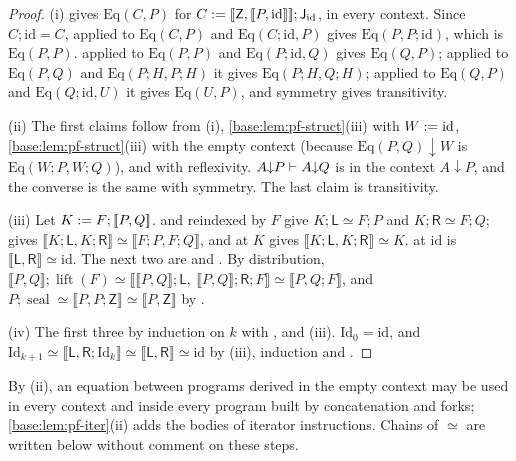 \begin{proof}
(i)  gives $\mathrm{Eq}(C,P)$ for
$C\mathrel{:=}[\![\mathsf Z,[\![ P,\mathrm{id}]\!]]\!];
\mathsf J_{\mathrm{id}}$, in every context.  Since $C;\mathrm{id}=C$,
 applied to $\mathrm{Eq}(C,P)$ and
$\mathrm{Eq}(C;\mathrm{id},P)$ gives $\mathrm{Eq}(P,P;\mathrm{id})$, which
is $\mathrm{Eq}(P,P)$.   applied to $\mathrm{Eq}(P,P)$ and
$\mathrm{Eq}(P;\mathrm{id},Q)$ gives $\mathrm{Eq}(Q,P)$; applied to
$\mathrm{Eq}(P,Q)$ and $\mathrm{Eq}(P;H,P;H)$ it gives
$\mathrm{Eq}(P;H,Q;H)$; applied to $\mathrm{Eq}(Q,P)$ and
$\mathrm{Eq}(Q;\mathrm{id},U)$ it gives $\mathrm{Eq}(U,P)$, and symmetry
gives transitivity.

(ii) The first claims follow from (i), \cref{base:lem:pf-struct}(iii) with
$W\mathrel{:=}\mathrm{id}$, \cref{base:lem:pf-struct}(iii) with the empty context
(because $\mathrm{Eq}(P,Q){\downarrow}W$ is $\mathrm{Eq}(W;P,W;Q)$), and
 with reflexivity.  $A{\downarrow}P\vdash A{\downarrow}Q$ is
 in the context $A{\downarrow}P$, and the converse is
the same with symmetry.  The last claim is transitivity.

(iii) Let $K\mathrel{:=} F;[\![ P,Q]\!]$.   and
 reindexed by $F$ give $K;\mathsf L\simeq F;P$ and
$K;\mathsf R\simeq F;Q$;  gives
$\llbracket K;\mathsf L,K;\mathsf R\rrbracket\simeq\llbracket F;P,F;Q\rrbracket$,
and  at $K$ gives
$\llbracket K;\mathsf L,K;\mathsf R\rrbracket\simeq K$.   at
$\mathrm{id}$ is $\llbracket\mathsf L,\mathsf R\rrbracket\simeq\mathrm{id}$.
The next two are  and .  By distribution,
$\llbracket P,Q\rrbracket;\operatorname{lift}(F)\simeq
\llbracket\llbracket P,Q\rrbracket;\mathsf L,\
\llbracket P,Q\rrbracket;\mathsf R;F\rrbracket\simeq\llbracket P,Q;F\rrbracket$,
and $P;\operatorname{seal}\simeq\llbracket P,P;\mathsf Z\rrbracket\simeq
\llbracket P,\mathsf Z\rrbracket$ by \rulename{C0}.

(iv) The first three by induction on $k$ with , 
and (iii).  $\mathrm{Id}_0=\mathrm{id}$, and
$\mathrm{Id}_{k+1}\simeq\llbracket\mathsf L,\mathsf R;\mathrm{Id}_k\rrbracket
\simeq\llbracket\mathsf L,\mathsf R\rrbracket\simeq\mathrm{id}$ by (iii),
induction and \rulename{CE}.
\end{proof}

By (ii), an equation between programs derived in the empty context may be
used in every context and inside every program built by concatenation and
forks; \cref{base:lem:pf-iter}(ii) adds the bodies of iterator
instructions.  Chains of $\simeq$ are written below without comment on
these steps.

